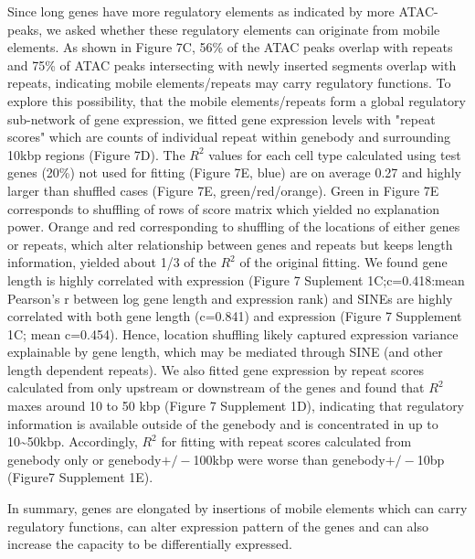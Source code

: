 Since long genes have more regulatory elements as indicated by more ATAC-peaks, we asked whether these regulatory elements can originate from mobile elements. As shown in Figure 7C, 56\% of the ATAC peaks overlap with repeats and 75\% of ATAC peaks intersecting with newly inserted segments overlap with repeats, indicating mobile elements/repeats may carry regulatory functions. To explore this possibility, that the mobile elements/repeats form a global regulatory sub-network of gene expression, we fitted gene expression levels with "repeat scores" which are counts of individual repeat within genebody and surrounding 10kbp regions (Figure 7D).  The $R^2$ values for each cell type calculated using test genes (20\%) not used for fitting (Figure 7E, blue) are on average 0.27 and highly larger than shuffled cases (Figure 7E, green/red/orange). Green in Figure 7E corresponds to shuffling of rows of score matrix which yielded no explanation power. Orange and red corresponding to shuffling of the locations of either genes or repeats, which alter relationship between genes and repeats but keeps length information, yielded about 1/3 of the $R^2$ of the original fitting. We found gene length is highly correlated with expression (Figure 7 Suplement 1C;c=0.418:mean Pearson's r between log gene length and expression rank) and SINEs are highly correlated with both gene length (c=0.841) and expression (Figure 7 Supplement 1C; mean c=0.454). Hence, location shuffling likely captured expression variance explainable by gene length, which may be mediated through SINE (and other length dependent repeats). We also fitted gene expression by repeat scores calculated from only upstream or downstream of the genes and found that $R^2$ maxes around 10 to 50 kbp (Figure 7 Supplement 1D), indicating that regulatory information is available outside of the genebody and is concentrated in up to 10\sim 50kbp. Accordingly, $R^2$ for fitting with repeat scores calculated from genebody only or genebody$+/-$100kbp were worse than genebody$+/-$10bp (Figure7 Supplement 1E). 

In summary, genes are elongated by insertions of mobile elements which can carry regulatory functions, can alter expression pattern of the genes and can also increase the capacity to be differentially expressed. 


